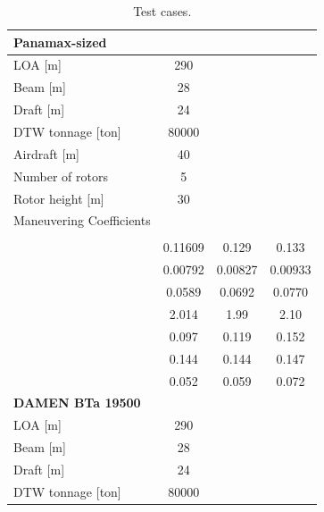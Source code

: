 \documentclass[twoside,twocolumn]{article}
\begin{document}
\begin{table}[!th]
	\caption{Test cases.}    
	\begin{tabular}{lSSS}
		
		\textbf{Panamax-sized}             &         &         &                \\ \midrule[1pt]
		LOA [m]                   & 290     &         &                \\
		Beam [m]                  & 28      &         &                \\
		Draft [m]                 & 24      &         &                \\
		DTW tonnage [ton]         & 80000   &         &                \\
		Airdraft [m]              & 40      &         &                \\
		Number of rotors          & 5       &         &                \\
		Rotor height [m]          & 30      &         & \smallskip     \\
		Maneuvering Coefficients  &         &         &                \\ 
		                       &    &    &            \\ \midrule
		\Xbb                      & 0.11609 & 0.129   & 0.133          \\
		\Xphiphi                  & 0.00792 & 0.00827 & 0.00933        \\
		\Yb                       & 0.0589  & 0.0692  & 0.0770         \\
		\Ybbb                     & 2.014   & 1.99    & 2.10           \\
		\Yphi                     & 0.097   & 0.119   & 0.152          \\
		\Nb                       & 0.144   & 0.144   & 0.147          \\
		\Nphi                     & 0.052   & 0.059   & 0.072	  \bigskip \\ 
		\textbf{DAMEN BTa 19500}           &         &         &                \\ \midrule[1pt]
		LOA [m]                   & 290     &         &                \\
		Beam [m]                  & 28      &         &                \\
		Draft [m]                 & 24      &         &                \\
		DTW tonnage [ton]         & 80000   &         &                \\

\end{tabular}
\end{table}
\end{document}
